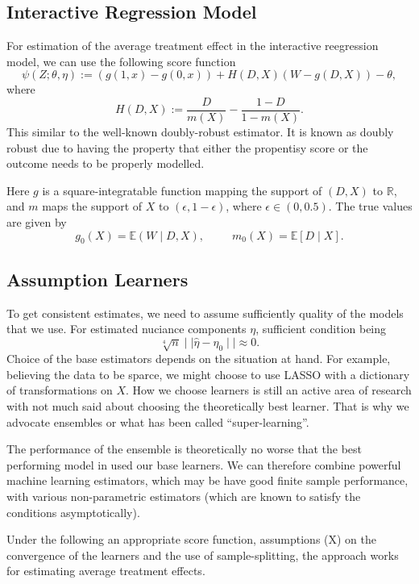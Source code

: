 \documentclass[
]{article}
\begin{document}
\subsection{Interactive Regression
Model}\label{interactive-regression-model}

For estimation of the average treatment effect in the interactive
reegression model, we can use the following score function \[
\psi(Z; \theta, \eta) := (g(1, x) - g(0, x)) + H(D, X)(W-g(D, X)) - \theta,
\] where \[
H(D, X) := \frac{D}{m(X)} - \frac{1-D}{1-m(X)}.
\] This similar to the well-known doubly-robust estimator. It is known
as doubly robust due to having the property that either the propentisy
score or the outcome needs to be properly modelled.

Here \(g\) is a square-integratable function mapping the support of
\((D, X)\) to \(\mathbb{R}\), and \(m\) maps the support of \(X\) to
\((\epsilon, 1-\epsilon)\), where \(\epsilon \in (0, 0.5)\). The true
values are given by \[
g_{0}(X) = \mathbb{E}(W \mid D, X), ~ ~ ~ ~ ~ ~ ~ ~ ~ ~ ~ m_{0}(X) = \mathbb{E}[D \mid X].
\]

\subsection{Assumption Learners}\label{assumption-learners}

To get consistent estimates, we need to assume sufficiently quality of
the models that we use. For estimated nuciance components \(\eta\),
sufficient condition being \[
\sqrt[4]{n } \mid\mid \hat{\eta} - \eta_{0} \mid\mid \approx 0.
\] Choice of the base estimators depends on the situation at hand. For
example, believing the data to be sparce, we might choose to use LASSO
with a dictionary of transformations on \(X\). How we choose learners is
still an active area of research with not much said about choosing the
theoretically best learner. That is why we advocate ensembles or what
has been called ``super-learning''.

The performance of the ensemble is theoretically no worse that the best
performing model in used our base learners. We can therefore combine
powerful machine learning estimators, which may be have good finite
sample performance, with various non-parametric estimators (which are
known to satisfy the conditions asymptotically).

Under the following an appropriate score function, assumptions (X) on
the convergence of the learners and the use of sample-splitting, the
approach works for estimating average treatment effects.
\end{document}
